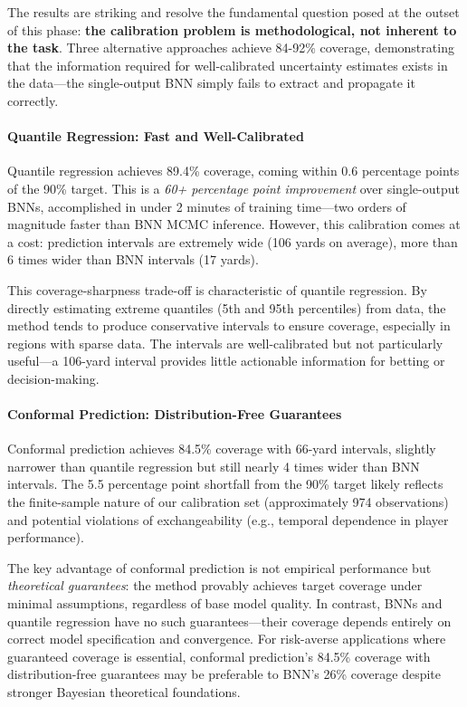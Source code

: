 The results are striking and resolve the fundamental question posed at the outset of this phase: \textbf{the calibration problem is methodological, not inherent to the task}. Three alternative approaches achieve 84-92\% coverage, demonstrating that the information required for well-calibrated uncertainty estimates exists in the data—the single-output BNN simply fails to extract and propagate it correctly.

\paragraph{Quantile Regression: Fast and Well-Calibrated}

Quantile regression achieves 89.4\% coverage, coming within 0.6 percentage points of the 90\% target. This is a \textit{60+ percentage point improvement} over single-output BNNs, accomplished in under 2 minutes of training time—two orders of magnitude faster than BNN MCMC inference. However, this calibration comes at a cost: prediction intervals are extremely wide (106 yards on average), more than 6 times wider than BNN intervals (17 yards).

This coverage-sharpness trade-off is characteristic of quantile regression. By directly estimating extreme quantiles (5th and 95th percentiles) from data, the method tends to produce conservative intervals to ensure coverage, especially in regions with sparse data. The intervals are well-calibrated but not particularly useful—a 106-yard interval provides little actionable information for betting or decision-making.

\paragraph{Conformal Prediction: Distribution-Free Guarantees}

Conformal prediction achieves 84.5\% coverage with 66-yard intervals, slightly narrower than quantile regression but still nearly 4 times wider than BNN intervals. The 5.5 percentage point shortfall from the 90\% target likely reflects the finite-sample nature of our calibration set (approximately 974 observations) and potential violations of exchangeability (e.g., temporal dependence in player performance).

The key advantage of conformal prediction is not empirical performance but \textit{theoretical guarantees}: the method provably achieves target coverage under minimal assumptions, regardless of base model quality. In contrast, BNNs and quantile regression have no such guarantees—their coverage depends entirely on correct model specification and convergence. For risk-averse applications where guaranteed coverage is essential, conformal prediction's 84.5\% coverage with distribution-free guarantees may be preferable to BNN's 26\% coverage despite stronger Bayesian theoretical foundations.


